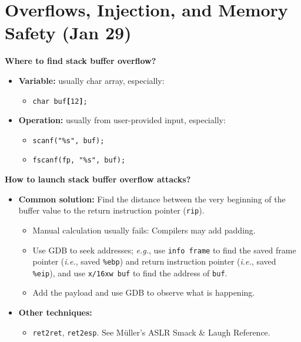 \documentclass{article}
\newcommand{\parhead}[1]{\noindent \textbf{#1}}
\begin{document}
\newpage
\section{Overflows, Injection, and Memory Safety (Jan 29)}
\parhead{Where to find stack buffer overflow?} 
\begin{itemize}
    \item \textbf{Variable:} usually char array, especially: 
    \begin{itemize}
        \item \texttt{char buf{\textbf{\color{red}[}}12{\textbf{\color{red}]}};}
    \end{itemize}
    
    \item \textbf{Operation:} usually from user-provided input, especially: 
    \begin{itemize}
        \item \texttt{scanf("\%s",~buf);}
        \item \texttt{fscanf(fp,~"\%s",~buf);}
    \end{itemize}
\end{itemize}

\parhead{How to launch stack buffer overflow attacks?}
\begin{itemize}
    \item \textbf{Common solution:} Find the distance between the very beginning of the buffer value to the return instruction pointer (\texttt{rip}).
    \begin{itemize}
        \item Manual calculation usually fails: Compilers may add padding.
        
        \item Use GDB to seek addresses; \emph{e.g.}, use \texttt{info frame} to find the saved frame pointer (\emph{i.e.}, saved \texttt{\%ebp}) and return instruction pointer (\emph{i.e.}, saved \texttt{\%eip}), and use \texttt{x/16xw buf} to find the address of \texttt{buf}. 
        
        \item Add the payload and use GDB to observe what is happening.
    \end{itemize}
    
    \item \textbf{Other techniques:}
    \begin{itemize}
        \item \texttt{ret2ret}, \texttt{ret2esp}. See M\"uller's ASLR Smack \& Laugh Reference.
    \end{itemize}
\end{itemize}
\end{document}
